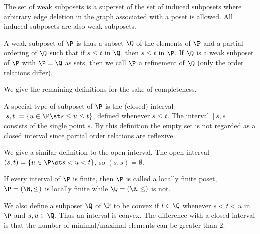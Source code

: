 The set of weak subposets is a superset of the set of induced subposets where
arbitrary edge deletion in the graph associated with a poset is allowed.
All induced subposets are also weak subposets.
\begin{definition}
A weak subposet of $\P$ is thus a subset $\Q$ of the elements of $\P$ and a
partial ordering of $\Q$ such that if $s \leq t$ in $\Q$, then $s \leq t$ in $\P$.
If $\Q$ is a weak subposet of $\P$ with $\P = \Q$ as sets, then we call $\P$ a
refinement of $\Q$ (only the order relations differ).
\end{definition}

We give the remaining definitions for the sake of completeness.
\begin{definition}
A special type of subposet of $\P$ is the (closed) interval $[s, t] = \left\{{u
\in \P \st s \leq u \leq t}\right\}$, defined whenever $s \leq t$. The interval
$[s, s]$ consists of the single point $s$.
By this definition the empty set is not regarded as a closed interval since
partial order relations are reflexive.
\end{definition}
\begin{definition}
We give a similar definition to the open interval.
The open interval $(s, t) = \left\{{u \in \P \st s < u <
t}\right\}$, so $(s, s) = \emptyset$.
\end{definition}
\begin{definition}
If every interval of $\P$ is finite, then $\P$ is called a locally finite poset,
\eg $\P = (\N, \le)$ is locally finite while $\Q = (\R, \le)$ is
not.
\end{definition}
\begin{definition}
We also define a subposet $\Q$ of $\P$ to be convex if $t \in \Q$ whenever $s < t
< u$ in $\P$ and $s, u \in \Q$. Thus an interval is convex. The difference with a
closed interval is that the number of minimal/maximal elements can be greater than 2.
\end{definition}

